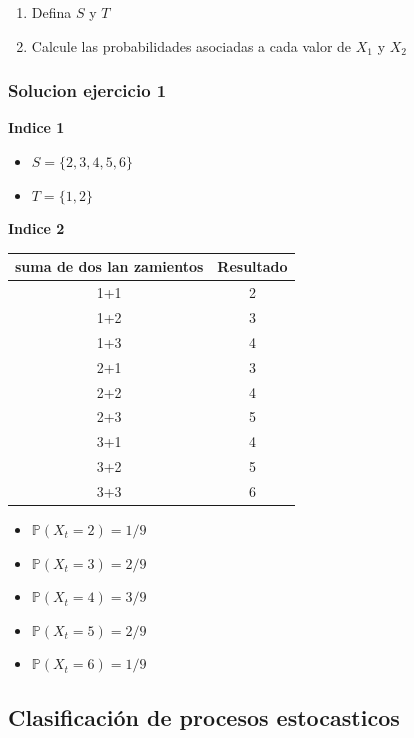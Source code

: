 \documentclass{article}
\begin{document}
\begin{enumerate}
    \item Defina \(S\) y \(T\)
    \item Calcule las probabilidades asociadas a cada valor de \(X_1\) y \(X_2\)
\end{enumerate}

\subsubsection*{Solucion ejercicio 1}

\textbf{Indice 1}
\begin{itemize}
    \item \(S = \{2,3,4,5,6\}\)
    \item \(T = \{1,2\}\)
\end{itemize}

\textbf{Indice 2}

\begin{tabular}{c|c}
    suma de dos lan zamientos & Resultado \\
    \hline
    1+1                       & 2         \\
    1+2                       & 3         \\
    1+3                       & 4         \\
    2+1                       & 3         \\
    2+2                       & 4         \\
    2+3                       & 5         \\
    3+1                       & 4         \\
    3+2                       & 5         \\
    3+3                       & 6         \\
\end{tabular}

\begin{itemize}
    \item $\mathbb{P}(X_t = 2) = 1/9$
    \item $\mathbb{P}(X_t = 3) = 2/9$
    \item $\mathbb{P}(X_t = 4) = 3/9$
    \item $\mathbb{P}(X_t = 5) = 2/9$
    \item $\mathbb{P}(X_t = 6) = 1/9$
\end{itemize}

\newpage

\subsection{Clasificación de procesos estocasticos}
\end{document}
